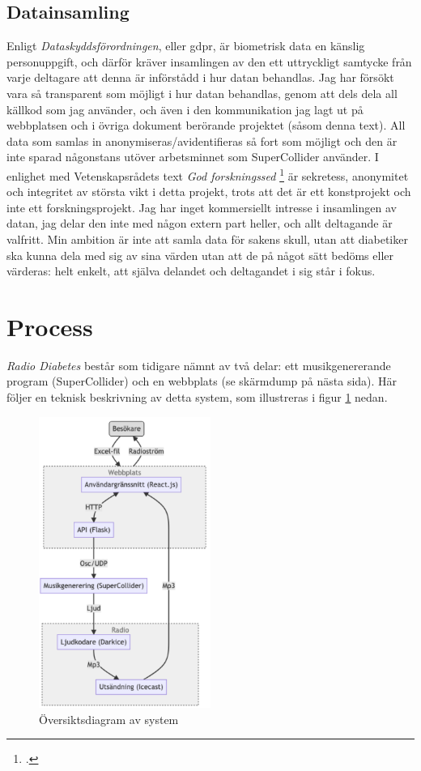 \documentclass[11pt, a4paper]{article} %
\begin{document}
\subsection*{Datainsamling}
Enligt \emph{Dataskyddsförordningen}, eller \gls{gdpr}, är biometrisk data en känslig personuppgift, och därför kräver insamlingen av den ett uttryckligt samtycke från varje deltagare att denna är införstådd i hur datan behandlas. Jag har försökt vara så transparent som möjligt i hur datan behandlas, genom att dels dela all källkod som jag använder, och även i den kommunikation jag lagt ut på webbplatsen och i övriga dokument berörande projektet (såsom denna text). All data som samlas in anonymiseras/avidentifieras så fort som möjligt och den är inte sparad någonstans utöver arbetsminnet som SuperCollider använder. I enlighet med Vetenskapsrådets text \emph{God forskningssed} \footcite[s. 40-41]{vetenskapsradet_god_2017} är sekretess, anonymitet och integritet av största vikt i detta projekt, trots att det är ett konstprojekt och inte ett forskningsprojekt. Jag har inget kommersiellt intresse i insamlingen av datan, jag delar den inte med någon extern part heller, och allt deltagande är valfritt. Min ambition är inte att samla data för sakens skull, utan att diabetiker ska kunna dela med sig av sina värden utan att de på något sätt bedöms eller värderas: helt enkelt, att själva delandet och deltagandet i sig står i fokus. 

\section*{Process}
\emph{Radio Diabetes} består som tidigare nämnt av två delar: ett musikgenererande program (SuperCollider) och en webbplats (se skärmdump på nästa sida). Här följer en teknisk beskrivning av detta system, som illustreras i figur \ref{system} nedan.

\begin{figure}[H]
\centering
\includegraphics[width=0.5\textwidth]{../media/flowchart.png}
\caption{Översiktsdiagram av system}
\label{system}
\end{figure}
\end{document}
